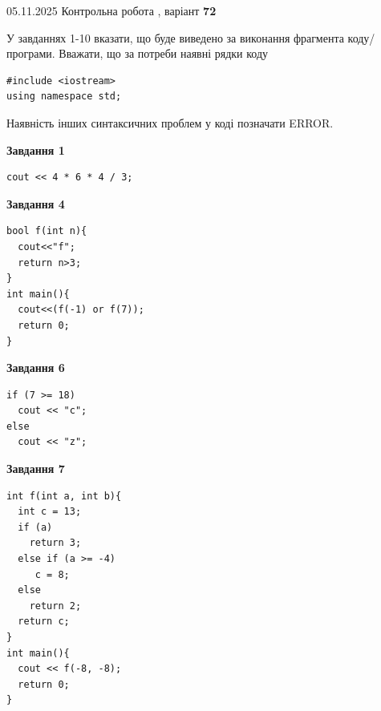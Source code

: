 \documentclass[12pt, ukrainian]{article}
\begin{document}
{\Large{05.11.2025 Контрольна робота , варіант  \No \textbf { 72 }\par}}
{
\begin {large}
У завданнях 1-10 вказати, що буде виведено за виконання фрагмента коду/про\-гра\-ми.
Вважати, що за потреби наявні рядки коду
\begin{verbatim}
#include <iostream>
using namespace std;
\end{verbatim}
Наявність інших синтаксичних проблем у коді позначати ERROR.

\begin{minipage}[t]{7.0cm}

\begin{center}
\textbf{Завдання 1}
\end{center}
\vspace{-8mm}

\begin{verbatim}
cout << 4 * 6 * 4 / 3;
\end{verbatim}



\begin{center}
\textbf{Завдання 4}
\end{center}
\vspace{-8mm}

\begin{verbatim}
bool f(int n){
  cout<<"f";
  return n>3;
}
int main(){
  cout<<(f(-1) or f(7));
  return 0;
}
\end{verbatim}



\begin{center}
\textbf{Завдання 6}
\end{center}
\vspace{-8mm}

\begin{verbatim}
if (7 >= 18)
  cout << "c";
else
  cout << "z";
\end{verbatim}



\begin{center}
\textbf{Завдання 7}
\end{center}
\vspace{-8mm}

\begin{verbatim}
int f(int a, int b){
  int c = 13;
  if (a)
    return 3;
  else if (a >= -4)
     c = 8;
  else
    return 2;
  return c;
}
int main(){
  cout << f(-8, -8);
  return 0;
}
\end{verbatim}


\end{minipage}
\end{large}}
\end{document}

